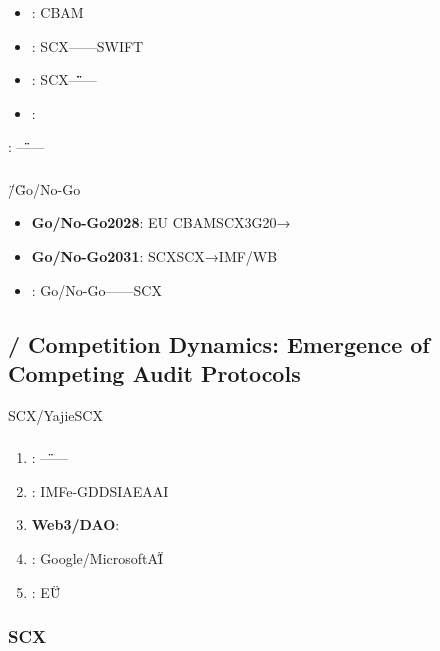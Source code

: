 \documentclass[12pt,a4paper]{article}
\theoremstyle{remark}
\begin{document}
\subsubsection{}



\begin{itemize}[nosep]
    \item \textbf{}: CBAM
    \item \textbf{}: SCX——SWIFT
    \item \textbf{}: SCX\"\"\"\"——
    \item \textbf{}: 
\end{itemize}

\textbf{}: \"\"——

\subsubsection{}

\"/\"Go/No-Go

\begin{itemize}[nosep]
    \item \textbf{Go/No-Go2028}: EU CBAMSCX3G20→
    \item \textbf{Go/No-Go2031}: SCXSCX→IMF/WB
    \item \textbf{}: Go/No-Go——SCX
\end{itemize}

\subsection{ / Competition Dynamics: Emergence of Competing Audit Protocols}

SCX/YajieSCX

\subsubsection{}

\begin{enumerate}[label=(\arabic*)]
    \item \textbf{}: \"\"——
    \item \textbf{}: IMFe-GDDSIAEAAI
    \item \textbf{Web3/DAO}: 
    \item \textbf{}: Google/MicrosoftAI\"\"
    \item \textbf{}: EU\"\"
\end{enumerate}

\subsubsection{SCX}
\end{document}
